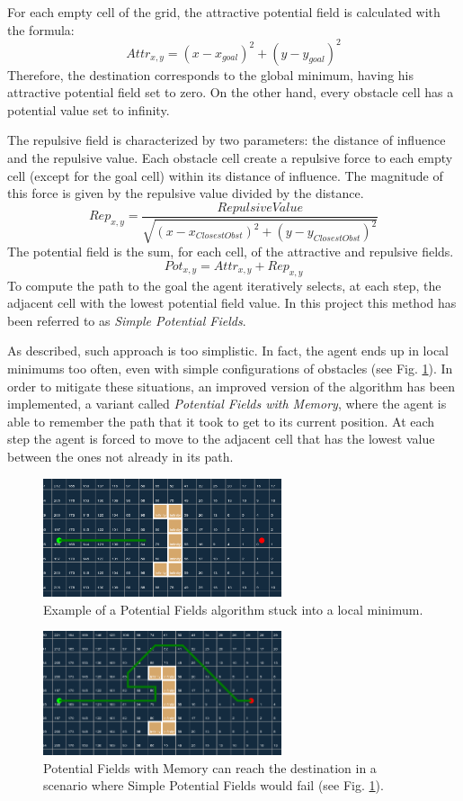 \documentclass[conference]{IEEEtran}
\begin{document}
For each empty cell of the grid, the attractive potential field is calculated with the formula:
\[ Attr_{x,y} = (x - x_{goal})^2 + (y - y_{goal})^2 \]
Therefore, the destination corresponds to the global minimum, having his attractive potential field set to zero. On the other hand, every obstacle cell has a potential value set to infinity.

The repulsive field is characterized by two parameters: the distance of influence and the repulsive value. Each obstacle cell create a repulsive force to each empty cell (except for the goal cell) within its distance of influence. The magnitude of this force is given by the repulsive value divided by the distance.
\[Rep_{x,y} = \frac{RepulsiveValue}{\sqrt{(x - x_{ClosestObst})^2 + (y - y_{ClosestObst})^2}}\]
The potential field is the sum, for each cell, of the attractive and repulsive fields.
\[ Pot_{x,y} = Attr_{x,y} + Rep_{x,y} \]
To compute the path to the goal the agent iteratively selects, at each step, the adjacent cell with the lowest potential field value. In this project this method has been referred to as \emph{Simple Potential Fields}.

As described, such approach is too simplistic. In fact, the agent ends up in local minimums too often, even with simple configurations of obstacles (see Fig. \ref{fig:potentialfield}). In order to mitigate these situations, an improved version of the algorithm has been implemented, a variant called \emph{Potential Fields with Memory}, where the agent is able to remember the path that it took to get to its current position. At each step the agent is forced to move to the adjacent cell that has the lowest value between the ones not already in its path.

\begin{figure}[]
	\includegraphics[width=7cm]{potentialfield.png}
	\centering
	\caption{Example of a Potential Fields algorithm stuck into a local minimum.}
	\label{fig:potentialfield}
\end{figure}

\begin{figure}[]
	\includegraphics[width=7cm]{potentialfieldmemory.png}
	\centering
	\caption{Potential Fields with Memory can reach the destination in a scenario where Simple Potential Fields would fail
		(see Fig. \ref{fig:potentialfield}).}
	\label{fig:potentialfieldmemory}
\end{figure}
\end{document}
